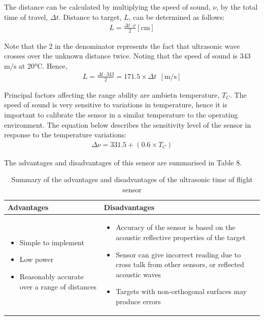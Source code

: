 \documentclass[a4paper]{article}
\begin{document}
The distance can be calculated by multiplying the speed of sound, $\nu$, by the total time of travel, $\Delta t$. Distance to target, $L$, can be determined as follows:
\begin{align*}
L = \frac{\Delta t \cdot \nu}{2} [\si{\centi\meter}]
\end{align*}

Note that the 2 in the denominator represents the fact that ultrasonic wave crosses over the unknown distance twice. Noting that the speed of sound is 343 $\si{\meter\per\second}$ at 20$\si{\celsius}$. Hence,
\begin{align*}
L = \frac{\Delta t \cdot 343}{2} = 171.5 \times \Delta t \ \  [\si{\meter\per\second}]
\end{align*}

Principal factors affecting the range ability are ambietn temperature, $T_C$. The speed of sound is very sensitive to variations in temperature, hence it is important to calibrate the sensor in a similar temperature to the operating environment. The equation below describes the sensitivity level of the sensor in response to the temperature variations:
\begin{align*}
\Delta \nu = 331.5 + (0.6 \times T_C)
\end{align*}

The advantages and disadvantages of this sensor are summarised in Table 8.
\begin{table}[h]
\centering
\caption{Summary of the advantages and disadvantages of the ultrasonic time of flight sensor} \footnotesize
\begin{tabular}{p{8cm}p{8cm}}
\toprule
\textbf{Advantages} & \textbf{Disadvantages}\\
\midrule
\begin{itemize}[leftmargin=0.3cm] \item Simple to implement \item Low power \item Reasonably accurate over a range of distances \end{itemize} & \begin{itemize}[leftmargin=0.3cm] \item Accuracy of the sensor is based on the acoustic reflective properties of the target \item Sensor can give incorrect reading due to cross talk from other sensors, or reflected acoustic waves \item Targets with non-orthogonal surfaces may produce errors \end{itemize}\\
\bottomrule
\end{tabular}
\end{table}
\end{document}
